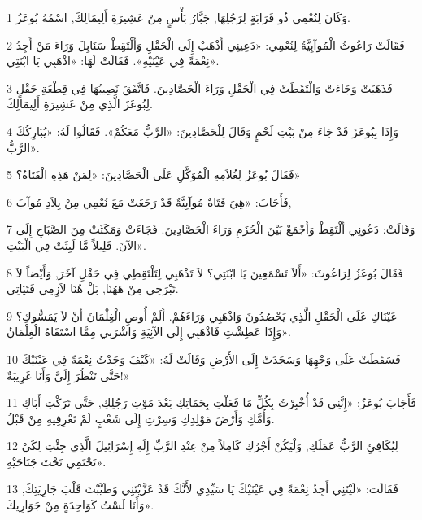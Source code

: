 \par 1 وَكَانَ لِنُعْمِي ذُو قَرَابَةٍ لِرَجُلِهَا, جَبَّارُ بَأْسٍ مِنْ عَشِيرَةِ أَلِيمَالِكَ, اسْمُهُ بُوعَزُ.
\par 2 فَقَالَتْ رَاعُوثُ الْمُوآبِيَّةُ لِنُعْمِي: «دَعِينِي أَذْهَبْ إِلَى الْحَقْلِ وَأَلْتَقِطْ سَنَابِلَ وَرَاءَ مَنْ أَجِدُ نِعْمَةً فِي عَيْنَيْهِ». فَقَالَتْ لَهَا: «اذْهَبِي يَا ابْنَتِي».
\par 3 فَذَهَبَتْ وَجَاءَتْ وَالْتَقَطَتْ فِي الْحَقْلِ وَرَاءَ الْحَصَّادِينَ. فَاتَّفَقَ نَصِيبُهَا فِي قِطْعَةِ حَقْلٍ لِبُوعَزَ الَّذِي مِنْ عَشِيرَةِ أَلِيمَالِكَ.
\par 4 وَإِذَا بِبُوعَزَ قَدْ جَاءَ مِنْ بَيْتِ لَحْمٍ وَقَالَ لِلْحَصَّادِينَ: «الرَّبُّ مَعَكُمْ». فَقَالُوا لَهُ: «يُبَارِكُكَ الرَّبُّ».
\par 5 فَقَالَ بُوعَزُ لِغُلاَمِهِ الْمُوَكَّلِ عَلَى الْحَصَّادِينَ: «لِمَنْ هَذِهِ الْفَتَاةُ؟»
\par 6 فَأَجَابَ: «هِيَ فَتَاةٌ مُوآبِيَّةٌ قَدْ رَجَعَتْ مَعَ نُعْمِي مِنْ بِلاَدِ مُوآبَ,
\par 7 وَقَالَتْ: دَعُونِي أَلْتَقِطْ وَأَجْمَعْ بَيْنَ الْحُزَمِ وَرَاءَ الْحَصَّادِينَ. فَجَاءَتْ وَمَكَثَتْ مِنَ الصَّبَاحِ إِلَى الآنَ. قَلِيلاً مَّا لَبِثَتْ فِي الْبَيْتِ».
\par 8 فَقَالَ بُوعَزُ لِرَاعُوثَ: «أَلاَ تَسْمَعِينَ يَا ابْنَتِي؟ لاَ تَذْهَبِي لِتَلْتَقِطِي فِي حَقْلِ آخَرَ, وَأَيْضاً لاَ تَبْرَحِي مِنْ هَهُنَا, بَلْ هُنَا لاَزِمِي فَتَيَاتِي.
\par 9 عَيْنَاكِ عَلَى الْحَقْلِ الَّذِي يَحْصُدُونَ وَاذْهَبِي وَرَاءَهُمْ. أَلَمْ أُوصِ الْغِلْمَانَ أَنْ لاَ يَمَسُّوكِ؟ وَإِذَا عَطِشْتِ فَاذْهَبِي إِلَى الآنِيَةِ وَاشْرَبِي مِمَّا اسْتَقَاهُ الْغِلْمَانُ».
\par 10 فَسَقَطَتْ عَلَى وَجْهِهَا وَسَجَدَتْ إِلَى الأَرْضِ وَقَالَتْ لَهُ: «كَيْفَ وَجَدْتُ نِعْمَةً فِي عَيْنَيْكَ حَتَّى تَنْظُرَ إِلَيَّ وَأَنَا غَرِيبَةٌ!»
\par 11 فَأَجَابَ بُوعَزُ: «إِنَّنِي قَدْ أُخْبِرْتُ بِكُلِّ مَا فَعَلْتِ بِحَمَاتِكِ بَعْدَ مَوْتِ رَجُلِكِ, حَتَّى تَرَكْتِ أَبَاكِ وَأُمَّكِ وَأَرْضَ مَوْلِدِكِ وَسِرْتِ إِلَى شَعْبٍ لَمْ تَعْرِفِيهِ مِنْ قَبْلُ.
\par 12 لِيُكَافِئِ الرَّبُّ عَمَلَكِ, وَلْيَكُنْ أَجْرُكِ كَامِلاً مِنْ عِنْدِ الرَّبِّ إِلَهِ إِسْرَائِيلَ الَّذِي جِئْتِ لِكَيْ تَحْتَمِي تَحْتَ جَنَاحَيْهِ».
\par 13 فَقَالَت: «لَيْتَنِي أَجِدُ نِعْمَةً فِي عَيْنَيْكَ يَا سَيِّدِي لأَنَّكَ قَدْ عَزَّيْتَنِي وَطَيَّبْتَ قَلْبَ جَارِيَتِكَ, وَأَنَا لَسْتُ كَوَاحِدَةٍ مِنْ جَوَارِيكَ».
